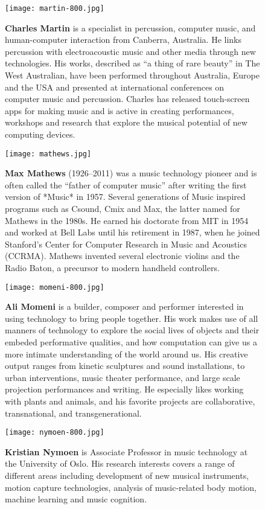\begin{authbio}
\begin{figure}[H]
  \sidecaption[t]
  \texttt{[image: martin-800.jpg]}
  \caption{\textbf{Charles Martin} is a specialist in percussion, computer music, and human-computer interaction from Canberra, Australia. He links percussion with electroacoustic music and other media through new technologies. His works, described as ``a thing of rare beauty'' in The West Australian, have been performed throughout Australia, Europe and the USA and presented at international conferences on computer music and percussion. Charles has released touch-screen apps for making music and is active in creating performances, workshops and research that explore the musical potential of new computing devices.}
\end{figure}

\begin{figure}[H]
  \sidecaption[t]
  \texttt{[image: mathews.jpg]}
  \caption{\textbf{Max Mathews} (1926--2011) was a music technology pioneer and is often called the ``father of computer music'' after writing the first version of *Music* in 1957. Several generations of Music inspired programs such as Csound, Cmix and Max, the latter named for Mathews in the 1980s. He earned his doctorate from MIT in 1954 and worked at Bell Labs until his retirement in 1987, when he joined Stanford's Center for Computer Research in Music and Acoustics (CCRMA). Mathews invented several electronic violins and the Radio Baton, a precursor to modern handheld controllers.}
\end{figure}


\begin{figure}[H]
  \sidecaption[t]
  \texttt{[image: momeni-800.jpg]}
  \caption{\textbf{Ali Momeni} is a builder, composer and performer interested in using technology to bring people together. His work makes use of all manners of technology to explore the social lives of objects and their embeded performative qualities, and how computation can give us a more intimate understanding of the world around us. His creative output ranges from kinetic sculptures and sound installations, to urban interventions, music theater performance, and large scale projection performances and writing. He especially likes working with plants and animals, and his favorite projects are collaborative, transnational, and transgenerational.}
\end{figure}

\begin{figure}[H]
  \sidecaption[t]
  \texttt{[image: nymoen-800.jpg]}
  \caption{\textbf{Kristian Nymoen} is Associate Professor in music technology at the University of Oslo. His research interests covers a range of different areas including development of new musical instruments, motion capture technologies, analysis of music-related body motion, machine learning and music cognition.}
\end{figure}


\end{authbio}
